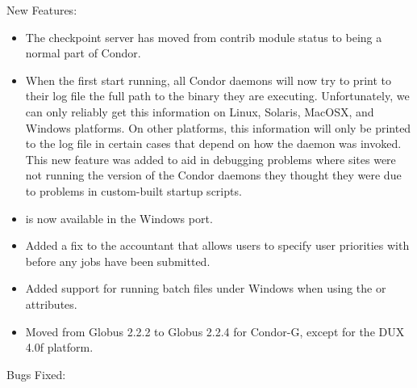 \noindent New Features:

\begin{itemize}

\item The checkpoint server has moved from contrib module status to being
	a normal part of Condor.

\item When the first start running, all Condor daemons will now try to
  print to their log file the full path to the binary they are
  executing. 
  Unfortunately, we can only reliably get this information on Linux,
  Solaris, MacOSX, and Windows platforms.
  On other platforms, this information will only be printed to the log
  file in certain cases that depend on how the daemon was invoked.
  This new feature was added to aid in debugging problems where sites
  were not running the version of the Condor daemons they thought they
  were due to problems in custom-built startup scripts.
 
\item {} is now available in the Windows port.

\item Added a fix to the accountant that allows users to specify user 
	priorities with  before any jobs have been submitted. 

\item Added support for running batch files under Windows when using the
	 or  attributes.

\item Moved from Globus 2.2.2 to Globus 2.2.4 for Condor-G, except for 
	the DUX 4.0f platform.

\end{itemize}

\noindent Bugs Fixed:

